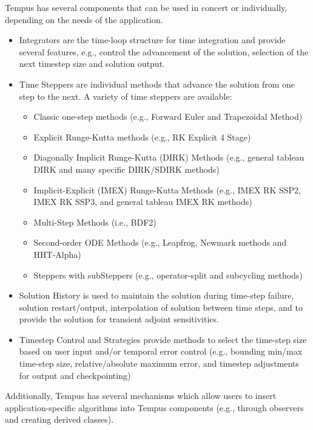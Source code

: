 Tempus has several components that can be used in concert or
individually, depending on the needs of the application.
\begin{itemize}
  \item Integrators are the time-loop structure for time integration
  and provide several features, e.g., control the advancement of
  the solution, selection of the next timestep size and solution
  output.

  \item Time Steppers are individual methods that advance the
  solution from one step to the next.  A variety of time steppers
  are available:
  \begin{itemize}
    \item Classic one-step methods (e.g., Forward Euler and Trapezoidal
    Method)
    \item Explicit Runge-Kutta methods (e.g., RK Explicit 4 Stage)
    \item Diagonally Implicit Runge-Kutta (DIRK) Methods (e.g.,
    general tableau DIRK and many specific DIRK/SDIRK methods)
    \item Implicit-Explicit (IMEX) Runge-Kutta Methods (e.g., IMEX
    RK SSP2, IMEX RK SSP3, and general tableau IMEX RK methods)
    \item Multi-Step Methods (i.e., BDF2)
    \item Second-order ODE Methods (e.g., Leapfrog, Newmark methods
    and HHT-Alpha)
    \item Steppers with subSteppers (e.g., operator-split and
    subcycling methods)
  \end{itemize}

  \item Solution History is used to maintain the solution during
  time-step failure, solution restart/output, interpolation of
  solution between time steps, and to provide the solution for
  transient adjoint sensitivities.

  \item Timestep Control and Strategies provide methods to select
  the time-step size based on user input and/or temporal error
  control (e.g., bounding min/max time-step size, relative/absolute
  maximum error, and timestep adjustments for output and checkpointing)

\end{itemize}
Additionally, Tempus has several mechanisms which allow users to
insert application-specific algorithms into Tempus components (e.g.,
through observers and creating derived classes).

